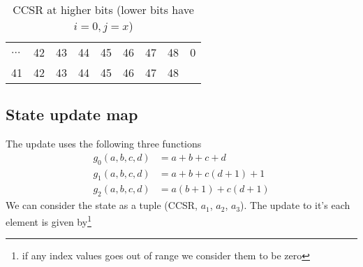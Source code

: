 \documentclass[a4paper,10pt]{article}
\begin{document}
\begin{itemize}
\begin{table}[h!]
\begin{tabular}{lllllllll}
\multicolumn{1}{|l|}{$\ldots$} & \multicolumn{1}{l|}{42} & \multicolumn{1}{l|}{43} & \multicolumn{1}{l|}{44} & \multicolumn{1}{l|}{45} & \multicolumn{1}{l|}{46} & \multicolumn{1}{l|}{47} & \multicolumn{1}{l|}{48} & 0 \\ \cline{1-8}
41                             & 42                      & 43                      & 44                      & 45                      & 46                      & 47                      & 48                      &  
\end{tabular}
\caption{CCSR at higher bits (lower bits have $i = 0, j = x$)}
\label{tab:ccsr}
\end{table}
\end{itemize}
\subsection{State update map}
The update uses the following three functions
\begin{equation}
    \begin{aligned}
    g_0(a,b,c,d) &= a+b+c+d\\
    g_1(a,b,c,d) &= a+b+c(d+1)+1\\
    g_2(a,b,c,d) &= a(b+1)+c(d+1)
    \end{aligned}
\end{equation}
We can consider the state as a tuple (CCSR, $a_{1}$, $a_{2}$, $a_{3}$). The update to it's each element is given by\footnote{if any index values goes out of range we consider them to be zero}
\end{document}
